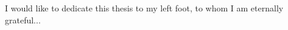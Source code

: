 
\begin{dedication} %

I would like to dedicate this thesis to my left foot, to whom I am eternally grateful...

\end{dedication}


